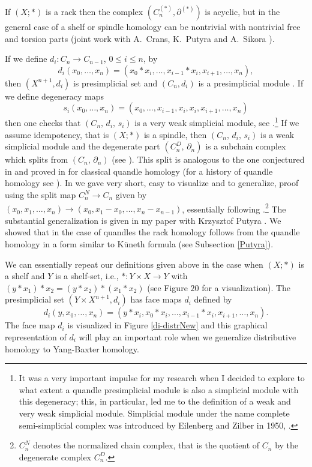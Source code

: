\documentclass[12pt]{amsart}
\begin{document}
If  $(X;*)$ is a rack then the complex $(C^{(*)}_n, \partial^{(*)})$ is acyclic, but in the general case
of a shelf or spindle homology can be nontrivial with nontrivial free and torsion parts (joint work with
A.~Crans, K.~Putyra and A.~Sikora \cite{CPP,PrPu1,P-S}).

If we define $d_i:C_n \to C_{n-1}$, $0\leq i \leq n$,  by
\begin{equation*}
d_i(x_0,\ldots,x_n)=(x_0*x_i,\ldots,x_{i-1}*x_i,x_{i+1},\ldots,x_n),
\end{equation*}
then $(X^{n+1},d_i)$  is presimplicial set and $(C_n,d_i)$ is a presimplicial module  .
If we define degeneracy maps
\begin{equation*}
s_i(x_0,\ldots,x_n)=(x_0,\ldots,x_{i-1},x_i,x_i,x_{i+1},\ldots,x_n)
\end{equation*}
then one checks that $(C_n,\,d_i,\,s_i)$ is a very weak simplicial module, see \cite{Prz8}.\footnote{
It was a very important impulse for my research when I decided to
explore to what extent  a quandle presimplicial 
module is also a simplicial module with this degeneracy; this, in particular, led me to the definition of a weak and very
weak simplicial module. Simplicial module under the name complete semi-simplicial complex was introduced by Eilenberg and Zilber in 1950, \cite{E-Z}.} If we assume idempotency, that is $(X;*)$ is a
spindle, then $(C_n,\,d_i,\,s_i)$ is a weak simplicial module and the degenerate part $(C^D_n,\,\partial_n)$
is a subchain complex which splits from $(C_n,\,\partial_n)$ (see \cite{Prz8}). This split is analogous to the one
conjectured in \cite{CJKS} and proved in \cite{L-N} for classical quandle homology (for a history of
quandle homology see \cite{Car}). In \cite{NiPr2} we
gave very short, easy to visualize and to generalize, proof using the split map $C^{N}_{n} \to C_{n}$ given by
$(x_0,x_1,\ldots,x_n) \to (x_0,x_1-x_0,\ldots,x_n-x_{n-1})$, essentially following \cite{L-N}.\footnote{$C^N_n$ denotes the normalized chain complex, that is the quotient of $C_n$ by the degenerate complex $C^D_n$.} The substantial generalization is given in my paper with Krzysztof Putyra \cite{PrPu2}. We showed that in the case of quandles the rack homology follows from the quandle homology in a form similar to K\"uneth formula (see Subsection \ref{Putyra}).

We can essentially repeat our definitions given above in
the case when $(X;\ast )$ is a shelf and $Y$ is a shelf-set, i.e., $\ast
:Y\times X\rightarrow Y$ with $(y\ast x_{1})\ast x_{2}=(y\ast x_{2})\ast
(x_{1}\ast x_{2})$ (see Figure $20$ for a visualization).
The presimplicial set $(Y\times X^{n+1},d_i)$ has face maps $d_i$ defined by
\begin{equation*}
d_i(y,x_0,\ldots,x_n)=(y*x_i,x_0*x_i,\ldots,x_{i-1}*x_i,x_{i+1},\ldots,x_n).  
\end{equation*}
The face map $d_i$ is visualized in Figure \ref{di-distrNew} and this graphical representation of $d_{i}$ will play an important role when we generalize distributive homology to Yang-Baxter homology.
\end{document}
